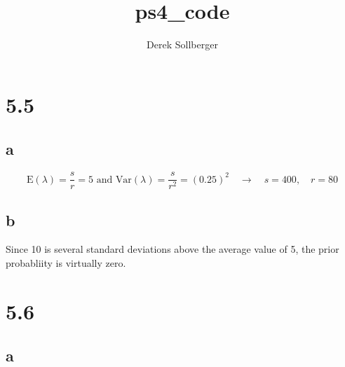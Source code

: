 \documentclass[
  letterpaper,
  DIV=11,
  numbers=noendperiod]{scrartcl}
\title{ps4\_code}
\author{Derek Sollberger}
\date{}
\renewcommand*\contentsname{Table of contents}
\newcommand\contentsname{Table of contents}
\begin{document}
\maketitle
\ifdefined\Shaded\renewenvironment{Shaded}{\begin{tcolorbox}[sharp corners, breakable, borderline west={3pt}{0pt}{shadecolor}, boxrule=0pt, enhanced, interior hidden, frame hidden]}{\end{tcolorbox}}\fi

\renewcommand*\contentsname{Table of contents}
{
\hypersetup{linkcolor=}
\setcounter{tocdepth}{3}
\tableofcontents
}
\newcommand{\ds}{\displaystyle}

\hypertarget{section}{%
\section{5.5}\label{section}}

\hypertarget{a}{%
\subsection{a}\label{a}}

\[\text{E}(\lambda) = \displaystyle\frac{s}{r} = 5 \text{ and } \text{Var}(\lambda) = \displaystyle\frac{s}{r^{2}} = (0.25)^{2} \quad\rightarrow\quad s = 400, \quad r = 80\]

\hypertarget{b}{%
\subsection{b}\label{b}}

Since 10 is several standard deviations above the average value of 5,
the prior probabliity is virtually zero.

\hypertarget{section-1}{%
\section{5.6}\label{section-1}}

\hypertarget{a-1}{%
\subsection{a}\label{a-1}}
\end{document}
